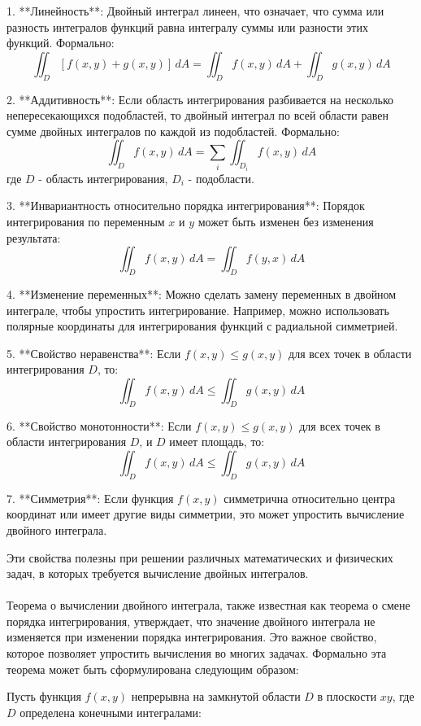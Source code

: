 \documentclass{article}
\begin{document}
   1. **Линейность**: Двойный интеграл линеен, что означает, что сумма или разность интегралов функций равна интегралу суммы или разности этих функций. Формально: 
      \[
      \iint_D [f(x, y) + g(x, y)] \, dA = \iint_D f(x, y) \, dA + \iint_D g(x, y) \, dA
      \]
   
   2. **Аддитивность**: Если область интегрирования разбивается на несколько непересекающихся подобластей, то двойный интеграл по всей области равен сумме двойных интегралов по каждой из подобластей. Формально:
      \[
      \iint_D f(x, y) \, dA = \sum_{i} \iint_{D_i} f(x, y) \, dA
      \]
      где $D$ - область интегрирования, $D_i$ - подобласти.
   
   3. **Инвариантность относительно порядка интегрирования**: Порядок интегрирования по переменным $x$ и $y$ может быть изменен без изменения результата:
      \[
      \iint_D f(x, y) \, dA = \iint_D f(y, x) \, dA
      \]
   
   4. **Изменение переменных**: Можно сделать замену переменных в двойном интеграле, чтобы упростить интегрирование. Например, можно использовать полярные координаты для интегрирования функций с радиальной симметрией.
   
   5. **Свойство неравенства**: Если $f(x, y) \leq g(x, y)$ для всех точек в области интегрирования $D$, то:
      \[
      \iint_D f(x, y) \, dA \leq \iint_D g(x, y) \, dA
      \]
   
   6. **Свойство монотонности**: Если $f(x, y) \leq g(x, y)$ для всех точек в области интегрирования $D$, и $D$ имеет площадь, то:
      \[
      \iint_D f(x, y) \, dA \leq \iint_D g(x, y) \, dA
      \]
   
   7. **Симметрия**: Если функция $f(x, y)$ симметрична относительно центра координат или имеет другие виды симметрии, это может упростить вычисление двойного интеграла.
   
   Эти свойства полезны при решении различных математических и физических задач, в которых требуется вычисление двойных интегралов.
\\ \\
Теорема о вычислении двойного интеграла, также известная как теорема о смене порядка интегрирования, утверждает, что значение двойного интеграла не изменяется при изменении порядка интегрирования. Это важное свойство, которое позволяет упростить вычисления во многих задачах. Формально эта теорема может быть сформулирована следующим образом:

Пусть функция $f(x, y)$ непрерывна на замкнутой области $D$ в плоскости $xy$, где $D$ определена конечными интегралами:
\end{document}

